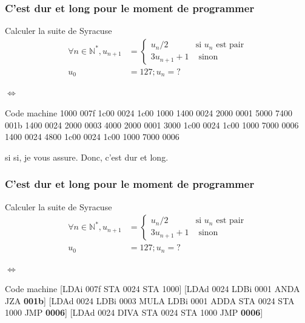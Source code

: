\documentclass{beamer}
\begin{document}
\begin{frame}
\frametitle{C'est dur et long pour le moment de programmer}

\begin{block}{Calculer la suite de Syracuse}
\begin{align*}
\forall n \in \mathbb{N}^*, u_{n+1} &=
\begin{cases}
u_n/2 & \mbox{si } u_n \mbox{ est pair}\\
3u_{n+1}+1 & \mbox{ sinon}
\end{cases}\\
u_0 &= 127 ; u_{n} = ?
\end{align*}
\end{block}
$\Leftrightarrow$
\begin{block}{Code machine}
1000 007f 1c00 0024  1c00 1000 1400 0024 2000 0001 5000 7400 001b
1400 0024 2000 0003 4000 2000 0001 3000 1c00 0024 1c00 1000 7000 0006 
1400 0024 4800 1c00 0024 1c00 1000 7000 0006 
\end{block}
si si, je vous assure. Donc, c'est dur et long.
\end{frame}

\begin{frame}
\frametitle{C'est dur et long pour le moment de programmer}

\begin{block}{Calculer la suite de Syracuse}
\begin{align*}
\forall n \in \mathbb{N}^*, u_{n+1} &=
\begin{cases}
u_n/2 & \mbox{si } u_n \mbox{ est pair}\\
3u_{n+1}+1 & \mbox{ sinon}
\end{cases}\\
u_0 &= 127 ; u_{n} = ?
\end{align*}
\end{block}
$\Leftrightarrow$
\begin{block}{Code machine}
[LDAi 007f STA 0024  STA 1000] [LDAd 0024 LDBi 0001 ANDA JZA \textbf{001b}]
[LDAd 0024 LDBi 0003 MULA LDBi 0001 ADDA STA 0024 STA 1000 JMP \textbf{0006}] 
[LDAd 0024 DIVA STA 0024 STA 1000 JMP \textbf{0006}]
\end{block}
\end{frame}
\end{document}
